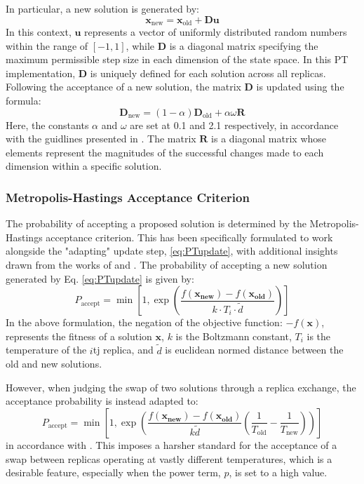 \documentclass[10pt]{article}
\begin{document}
\begin{multicols}{2}
In particular, a new solution is generated by:
\begin{equation}
\mathbf{x}_{\text{new}} = \mathbf{x}_{\text{old}} + \mathbf{D}\mathbf{u}
\label{eq:PTupdate}
\end{equation}
In this context, $\mathbf{u}$ represents a vector of uniformly distributed random numbers within the range of $[-1, 1]$, while $\mathbf{D}$ is a diagonal matrix specifying the maximum permissible step size in each dimension of the state space. In this PT implementation, $\mathbf{D}$ is uniquely defined for each solution across all replicas. Following the acceptance of a new solution, the matrix $\mathbf{D}$ is updated using the formula:
\[
\mathbf{D}_{\text{new}} = (1-\alpha)\mathbf{D}_{\text{old}} + \alpha \omega \mathbf{R}
\]
Here, the constants $\alpha$ and $\omega$ are set at 0.1 and 2.1 respectively, in accordance with the guidlines presented in \cite{NT90-A34350}. The matrix $\mathbf{R}$ is a diagonal matrix whose elements represent the magnitudes of the successful changes made to each dimension within a specific solution.

\subsubsection{Metropolis-Hastings Acceptance Criterion}
\label{sec:PT_MA}

The probability of accepting a proposed solution is determined by the Metropolis-Hastings acceptance criterion. This has been specifically formulated to work alongside the "adapting" update step, \ref{eq:PTupdate}, with additional insights drawn from the works of \cite{NT90-A34350} and \cite{Neal_1996}. The probability of accepting a new solution generated by Eq. \ref{eq:PTupdate} is given by:
\[
    P_{\text{accept}} = \min\left[1, \exp\left(\frac{f(\mathbf{x_{\text{new}}}) - f(\mathbf{x_{\text{old}}})}{k \cdot T_i \cdot \tilde{d}}\right)\right]
\]
In the above formulation, the negation of the objective function: $-f(\mathbf{x})$, represents the fitness of a solution $\mathbf{x}$, $k$ is the Boltzmann constant, $T_i$ is the temperature of the $i$tj replica, and $\tilde{d}$ is euclidean normed distance between the old and new solutions.

However, when judging the swap of two solutions through a replica exchange, the acceptance probability is instead adapted to:
\[
    P_{\text{accept}} = \min\left[1, \exp\left(\frac{f(\mathbf{x_{\text{new}}}) - f(\mathbf{x_{\text{old}}})}{k \tilde{d}} \left(\frac{1}{T_{\text{old}}} - \frac{1}{T_{\text{new}}}\right)\right)\right]
\]
in accordance with \cite{Neal_1996}. This imposes a harsher standard for the acceptance of a swap between replicas operating at vastly different temperatures, which is a desirable feature, especially when the power term, $p$, is set to a high value.


\end{multicols}
\end{document}
